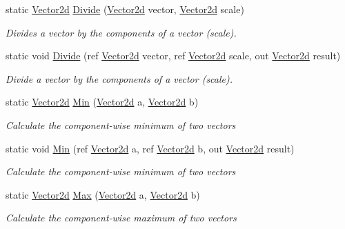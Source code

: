 \begin{DoxyCompactItemize}
static \hyperlink{struct_open_t_k_1_1_vector2d}{Vector2d} \hyperlink{struct_open_t_k_1_1_vector2d_a3d4e9431e33cbfe73d704cb56e963846}{Divide} (\hyperlink{struct_open_t_k_1_1_vector2d}{Vector2d} vector, \hyperlink{struct_open_t_k_1_1_vector2d}{Vector2d} scale)
\begin{DoxyCompactList}\small\item\em Divides a vector by the components of a vector (scale). \end{DoxyCompactList}\item 
static void \hyperlink{struct_open_t_k_1_1_vector2d_a107e0c2d951b215a797cdd06ae3a7c66}{Divide} (ref \hyperlink{struct_open_t_k_1_1_vector2d}{Vector2d} vector, ref \hyperlink{struct_open_t_k_1_1_vector2d}{Vector2d} scale, out \hyperlink{struct_open_t_k_1_1_vector2d}{Vector2d} result)
\begin{DoxyCompactList}\small\item\em Divide a vector by the components of a vector (scale). \end{DoxyCompactList}\item 
static \hyperlink{struct_open_t_k_1_1_vector2d}{Vector2d} \hyperlink{struct_open_t_k_1_1_vector2d_a7708efc90e19b365d34bc90a23f35da8}{Min} (\hyperlink{struct_open_t_k_1_1_vector2d}{Vector2d} a, \hyperlink{struct_open_t_k_1_1_vector2d}{Vector2d} b)
\begin{DoxyCompactList}\small\item\em Calculate the component-\/wise minimum of two vectors \end{DoxyCompactList}\item 
static void \hyperlink{struct_open_t_k_1_1_vector2d_a83a45ef8e39bfc05a619714066245d0d}{Min} (ref \hyperlink{struct_open_t_k_1_1_vector2d}{Vector2d} a, ref \hyperlink{struct_open_t_k_1_1_vector2d}{Vector2d} b, out \hyperlink{struct_open_t_k_1_1_vector2d}{Vector2d} result)
\begin{DoxyCompactList}\small\item\em Calculate the component-\/wise minimum of two vectors \end{DoxyCompactList}\item 
static \hyperlink{struct_open_t_k_1_1_vector2d}{Vector2d} \hyperlink{struct_open_t_k_1_1_vector2d_aa8579863bb3cf5006eb1d2005ddbd7a3}{Max} (\hyperlink{struct_open_t_k_1_1_vector2d}{Vector2d} a, \hyperlink{struct_open_t_k_1_1_vector2d}{Vector2d} b)
\begin{DoxyCompactList}\small\item\em Calculate the component-\/wise maximum of two vectors \end{DoxyCompactList}\item 

\end{DoxyCompactItemize}

